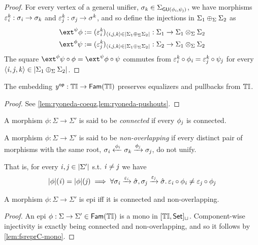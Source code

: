 \begin{proof}
    For every vertex of a general unifier, $\sigma_{\mathit{k}} \in \Sigma_{\mathsf{GU}(\phi_{\mathit{i}}, \psi_{\mathit{j}})}$,
    we have morphisms $\varepsilon^{\mathit{k}}_{\mathit{i}}: \sigma_{\mathit{i}} \to \sigma_{\mathit{k}}$ and $\varepsilon^{\mathit{k}}_{\mathit{j}}: \sigma_{\mathit{j}} \to \sigma^{\mathit{k}}$,
    and so define the injections in $\Sigma_1 \oplus_{\Sigma} \Sigma_2$ as
    \begin{align*}
            \ext^\psi\phi \eqdef \tlistr{\me^\vk_\vi}{\triple\vi\vj\vk \in \indF{\Sigma_1 \liplus\Sigma \Sigma_2}} : \Sigma_1 \to \Sigma_1 \pltimes\Sigma \Sigma_2 \\
            \ext^\phi\psi \eqdef \tlistr{\me^\vk_\vj}{\triple\vi\vj\vk \in \indF{\Sigma_1 \liplus\Sigma \Sigma_2}} : \Sigma_2 \to \Sigma_1 \pltimes\Sigma \Sigma_2
    \end{align*}
    The square $\ext^\phi\psi \comp \phi = \ext^\psi\phi \comp \psi$ commutes from $\varepsilon^{\mathit{k}}_{\mathit{i}} \circ \phi_{\mathit{i}} = \varepsilon^{\mathit{k}}_{\mathit{j}} \circ \psi_{\mathit{j}}$ for every $\langle\mathit{i}, \mathit{j}, \mathit{k}\rangle \in |{\Sigma_1 \oplus_{\Sigma} \Sigma_2}|$.
\end{proof}

\begin{lemma}
    The embedding ${\mathit{y}}^{\mathsf{op}} : {\mathbb{T}\mathbb{I}} \to \mathsf{Fam}({{\mathbb{T}\mathbb{I}}})$ preserves equalizers and pullbacks from ${\mathbb{T}\mathbb{I}}$.  
\end{lemma}
\begin{proof}
    See \cref{lem:ryoneda-coeqz,lem:ryoneda-pushouts}.
\end{proof}

\begin{definition}
    A morphism $\phi : \Sigma \to \Sigma'$ is said to be \emph{connected} if every $\phi_{\mathit{j}}$ is connected.
\end{definition}

\begin{definition}
    A morphism $\phi : \Sigma \to \Sigma'$ is said to be \emph{non-overlapping} if 
    every distinct pair of morphisms with the same root, 
    $\sigma_{\mathit{i}} \xleftarrow{\phi_{\mathit{i}}} \sigma_{\mathit{k}} \xrightarrow{\phi_{\mathit{j}}} \sigma_{\mathit{j}}$, 
    do not unify.

    That is, for every $\mathit{i}, \mathit{j} \in |{\Sigma'}|$ s.t. $\mathit{i} \neq \mathit{j}$ we have
    \[ 
        |{\phi}|(\mathit{i}) = |{\phi}|(\mathit{j}) \implies 
            \forall \sigma_{\mathit{i}} \xrightarrow{\varepsilon_{\mathit{i}}} \hat\sigma,\sigma_{\mathit{j}} \xrightarrow{\varepsilon_{\mathit{j}}} \hat\sigma.\, 
        \varepsilon_{\mathit{i}} \circ \phi_{\mathit{i}} \neq \varepsilon_{\mathit{j}} \circ \phi_{\mathit{j}}
    \]
\end{definition}

\begin{lemma}\label{lem:fam-tinstC-epi}
     A morphism $\phi : \Sigma \to \Sigma'$ is epi iff it is connected and non-overlapping.
\end{lemma}
\begin{proof}
    An epi $\phi : \Sigma \to \Sigma' \in \mathsf{Fam}({{\mathbb{T}\mathbb{I}}})$ is a mono in $[{\mathbb{T}\mathbb{I}}, \mathsf{Set}]_\sqcup$.
    Component-wise injectivity is exactly being connected and non-overlapping, and so it follows by \cref{lem:fsreprC-mono}.
\end{proof}

